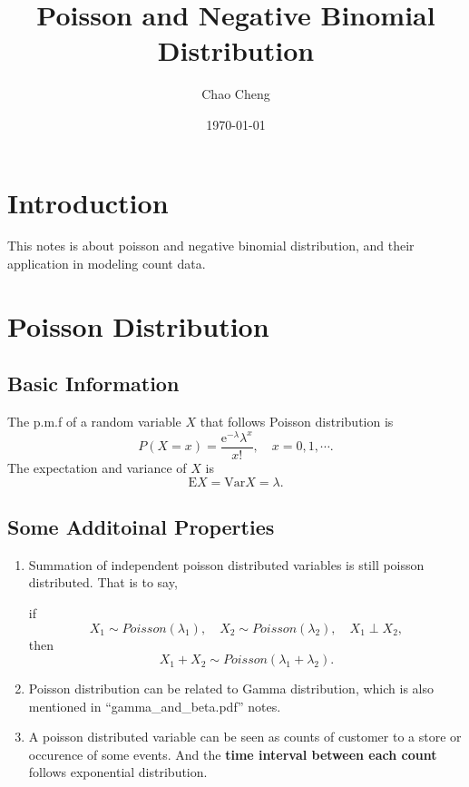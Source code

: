 \documentclass[a4paper,12pt]{article}
\title{Poisson and Negative Binomial Distribution}
\author{Chao Cheng}
\date{\today}
\begin{document}
\maketitle

\tableofcontents{}

\section{Introduction}
\label{sec:introduction}

This notes is about poisson and negative binomial distribution, and their application in modeling count data.

\section{Poisson Distribution}
\label{sec:poisson-distribution}

\subsection{Basic Information}
\label{sec:basic-information}

The p.m.f of a random variable $X$ that follows Poisson distribution is
\[
  P\left(X = x\right) = \frac{\mathrm{e}^{-\lambda}\lambda^x}{x!}, \quad x = 0, 1, \cdots.
\]
The expectation and variance of $X$ is
\[
  \mathrm{E}X = \mathrm{Var}X = \lambda.
\]

\subsection{Some Additoinal Properties}
\label{sec:some-addit-prop}

\begin{enumerate}
\item Summation of independent poisson distributed variables is still poisson distributed. That is to say,
  \par
  if
  \[
    X_1\sim Poisson(\lambda_1),\quad
    X_2\sim Poisson(\lambda_2),\quad
    X_1 \perp X_2
    ,
  \]
  then
  \[
    X_1 + X_2 \sim Poisson(\lambda_1 + \lambda_2)
    .
  \]
\item Poisson distribution can be related to Gamma distribution, which is also mentioned in ``gamma\_and\_beta.pdf'' notes.
\item A poisson distributed variable can be seen as counts of customer to a store or occurence of some events. And the \textbf{time interval between each count} follows exponential distribution. 
\end{enumerate}
\end{document}
